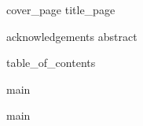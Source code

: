 \documentclass[12pt, a4paper, oneside]{report}
\begin{document}
    {cover_page}\clearpage
    {title_page}\clearpage

    \onehalfspacing

    {acknowledgements}\clearpage
    {abstract}\clearpage

    {table_of_contents}\clearpage
    \listoffigures\clearpage
    \listoftables
    
    \printglossary[type=\acronymtype]\clearpage
    \printglossary\clearpage

    {main}

    \clearpage
    
    

    {main}
\end{document}
